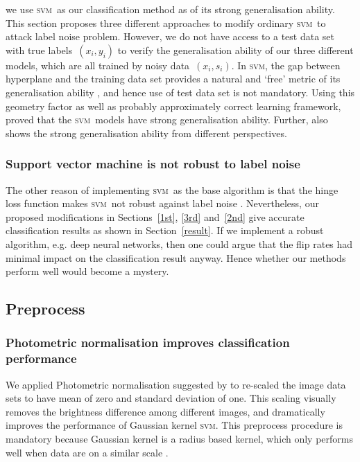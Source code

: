 \documentclass[12pt]{article} %
\newcommand{\svm}{\textsc{svm}}
\begin{document}
we use \svm\ as our classification method as of its strong generalisation ability. %
This section proposes three different approaches to modify ordinary \svm\ to attack label noise problem. However, we do not have access to a test data set with true labels~$(x_i,y_i)$ to verify the generalisation ability of our three different models, which are all trained by noisy data~$(x_i,s_i)$. In \svm , the gap between hyperplane and the training data set provides a natural and `free' metric of its generalisation ability  \citep{hastie01statisticallearning}, and hence use of test data set is not mandatory. Using this geometry factor as well as probably approximately correct learning framework,  \citet{NIPS2012_4500} proved that the  \svm\ models have strong generalisation ability. Further,  \citep{Cortes1995,Seeger:2003:PGE:944919.944929} also shows the strong generalisation ability from different perspectives.

\subsubsection{Support vector machine is not robust to label noise}

The other reason of implementing \svm\ as the base algorithm is that the hinge loss function makes \svm\ not robust against label noise \citep{frenay2014classification}. Nevertheless, our proposed modifications in Sections~\ref{1st}, \ref{3rd} and~\ref{2nd} give accurate classification results as shown in Section~\ref{result}. If we implement a robust algorithm, e.g. deep neural networks, then one could argue that the flip rates had minimal impact on the classification result anyway. Hence whether our methods perform well would become a mystery.


\subsection{Preprocess}\label{preproc}
\subsubsection{Photometric normalisation improves classification performance}
We applied Photometric normalisation suggested by \citet{jonsson2002support} to re-scaled the image data sets to have mean of zero and standard deviation of one. This scaling visually removes the brightness difference among different images, and dramatically improves the performance of Gaussian kernel \svm . This preprocess procedure is mandatory because Gaussian kernel is a radius based kernel, which only performs well when data are on a similar scale \citep{jonsson2002support}.
\end{document}
